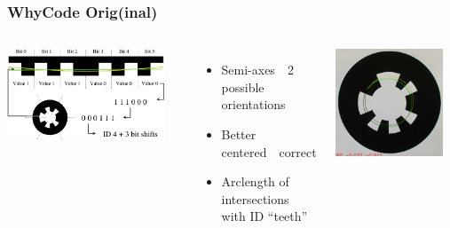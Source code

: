 \documentclass[aspectratio=169]{rubeamer}
\begin{document}
\begin{frame}
  \frametitle{WhyCode Orig(inal)}
  \begin{columns}
    \includegraphics[width=0.9\textwidth]{whycode_layout_with_sample_lines}
    \begin{itemize}
      \item Semi-axes~\textrightarrow~2 possible orientations
      \item Better centered~\textrightarrow~correct
      \item Arclength of intersections with ID ``teeth''
    \end{itemize}
    \centering
    \onslide
    \includegraphics[width=0.9\textwidth]{whycode_orig_both_solutions_cropped}
  \end{columns}
\end{frame}
\end{document}
